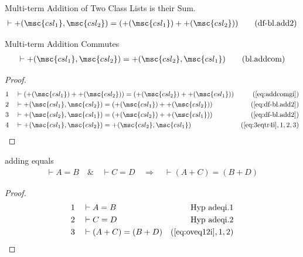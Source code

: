 \begin{metadefinition} Multi-term Addition of Two Class
Lists is their Sum.
\begin{align}
\vdash +( \msc{csl_1} , \msc{csl_2} ) = ( +( \msc{csl_1} ) + +( \msc{csl_2} )
    )\label{eq:df-bl.add2}\tag{df-bl.add2}
\end{align}
\end{metadefinition}

\begin{lemma} Multi-term Addition Commutes
\begin{align}
\vdash +( \msc{csl_1} , \msc{csl_2} ) = +( \msc{csl_2} , \msc{csl_1}
    )\label{eq:bl.addcom}\tag{bl.addcom}
\end{align}
\end{lemma}

\begin{proof}
\begin{align}
  1 &&  & \vdash ( +( \msc{csl_1} ) + +( \msc{csl_2} ) ) = ( +( \msc{csl_2} ) + +( \msc{csl_1} ) )&(\mbox{\ref{eq:addcomgi}})\notag
  \\ 2 &&  & \vdash +( \msc{csl_1} , \msc{csl_2} ) = ( +( \msc{csl_1} ) + +( \msc{csl_2} ) )&(\mbox{\ref{eq:df-bl.add2}})\notag
  \\ 3 &&  & \vdash +( \msc{csl_2} , \msc{csl_1} ) = ( +( \msc{csl_2} ) + +( \msc{csl_1} ) )&(\mbox{\ref{eq:df-bl.add2}})\notag
  \\ 4 &&  & \vdash +( \msc{csl_1} , \msc{csl_2} ) = +( \msc{csl_2} , \msc{csl_1} )&(\mbox{\ref{eq:3eqtr4i}},1,2,3)\notag
\end{align}
\end{proof}

\begin{lemma} adding equals
\begin{align}
\vdash A = B\quad\&\quad \vdash C = D\quad\Rightarrow\quad \vdash ( A + C ) = (
    B + D )\label{eq:bl.adeqi}\tag{bl.adeqi}
\end{align}
\end{lemma}

\begin{proof}
\begin{align}
  1 &&  & \vdash A = B&\text{Hyp~adeqi.1}\notag%
  \\ 2 &&  & \vdash C = D&\text{Hyp~adeqi.2}\notag%
  \\ 3 &&  & \vdash ( A + C ) = ( B + D )&(\mbox{\ref{eq:oveq12i}},1,2)\notag
\end{align}
\end{proof}

